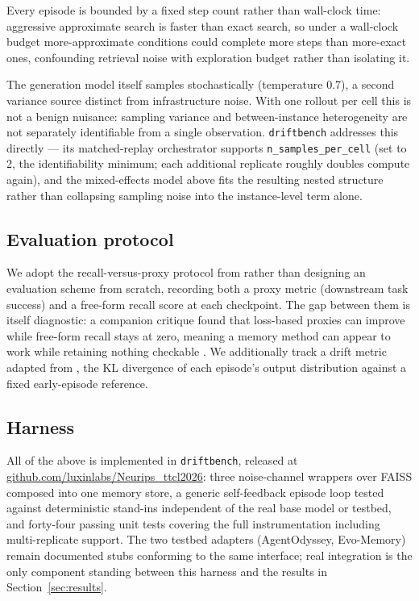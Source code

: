 \documentclass{article}
\begin{document}
Every episode is bounded by a fixed step count rather than wall-clock time: aggressive approximate search is faster than exact search, so under a wall-clock budget more-approximate conditions could complete more steps than more-exact ones, confounding retrieval noise with exploration budget rather than isolating it.

The generation model itself samples stochastically (temperature 0.7), a second variance source distinct from infrastructure noise. With one rollout per cell this is not a benign nuisance: sampling variance and between-instance heterogeneity are not separately identifiable from a single observation. \texttt{driftbench} addresses this directly --- its matched-replay orchestrator supports \texttt{n\_samples\_per\_cell} (set to 2, the identifiability minimum; each additional replicate roughly doubles compute again), and the mixed-effects model above fits the resulting nested structure rather than collapsing sampling noise into the instance-level term alone.

\subsection{Evaluation protocol}

We adopt the recall-versus-proxy protocol from \citet{dong2026seqmemeval} rather than designing an evaluation scheme from scratch, recording both a proxy metric (downstream task success) and a free-form recall score at each checkpoint. The gap between them is itself diagnostic: a companion critique found that loss-based proxies can improve while free-form recall stays at zero, meaning a memory method can appear to work while retaining nothing checkable \citep{song2026beyondperplexity}. We additionally track a drift metric adapted from \citet{mishra2026rdumbplusplus}, the KL divergence of each episode's output distribution against a fixed early-episode reference.

\subsection{Harness}

All of the above is implemented in \texttt{driftbench}, released at \url{github.com/luxinlabs/Neurips_ttcl2026}: three noise-channel wrappers over FAISS composed into one memory store, a generic self-feedback episode loop tested against deterministic stand-ins independent of the real base model or testbed, and forty-four passing unit tests covering the full instrumentation including multi-replicate support. The two testbed adapters (AgentOdyssey, Evo-Memory) remain documented stubs conforming to the same interface; real integration is the only component standing between this harness and the results in Section~\ref{sec:results}.
\end{document}
